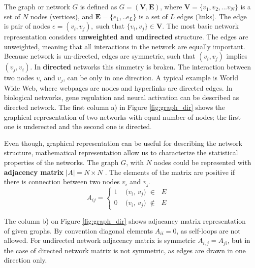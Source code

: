 The graph or network $G$ is defined as $G=(\boldsymbol{V}, \boldsymbol{E})$, where $\boldsymbol{V} = \{ v_1, v_2, ... v_N\}$ is a set of $N$ nodes (vertices), and  $\boldsymbol{E} = \{e_1, .. e_L\}$ is a set of $L$ edges (links). The edge is pair of nodes $e = (v_i, v_j), $ such that $\{v_i,v_j\}\in \boldsymbol{V}$. The most basic network representation considers \textbf{unweighted and undirected} structure. The edges are unweighted, meaning that all interactions in the network are equally important.  Because network is un-directed, edges are symmetric, such that $(v_i, v_j)$ implies $(v_j, v_i)$. In \textbf{directed} networks this simmetry is broken. The interaction between two nodes $v_i$ and $v_j$, can be only in one direction. A typical example is World Wide Web, where webpages are nodes and hyperlinks are directed edges. In biological networks, gene regulation and neural activation can be described as directed network. The first column a) in Figure \ref{fig:graph_dir} shows the graphical representation of two networks with equal number of nodes; the first one is underected and the second one is directed. 

Even though, graphical representation can be useful for describing the network structure, mathematical representation allow us to characterize the statistical properties of the networks. The graph $G$, with $N$ nodes could be represented with \textbf{adjacency matrix} $|A| = N \times N$ \cite{boccaletti2006complex}. The elements of the matrix are positive if there is connection between two nodes $v_i$ and $v_j$. 
\begin{equation}
A_{ij} =
\begin{cases}
1 & \text{ ($v_i$, $v_j$) $\in$ $E$}\\
0 & \text{ ($v_i$, $v_j$) $\notin$ $E$}
\end{cases}       
\end{equation}

The column b) on Figure \ref{fig:graph_dir} shows adjacancy matrix representation of given graphs. By convention diagonal elements $A_{ii}=0$, as self-loops are not allowed. For undirected network adjacency matrix is symmetric $A_{i,j}=A_{ji}$, but in the case of directed network matrix is not symmetric, as edges are drawn in one direction only.  

